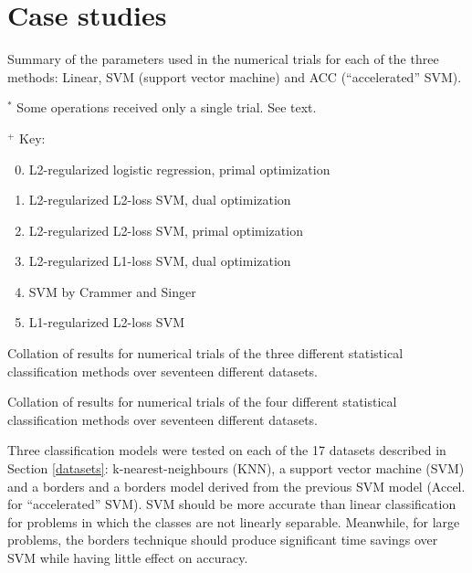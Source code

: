 \section{Case studies}

\label{results_section}

\begin{table}
	\caption{Summary of the parameters used in the numerical trials for each of the three methods: Linear, SVM (support vector machine) and ACC (``accelerated'' SVM).}
	\label{param}
	
	\vspace{1 ex}

	\raggedright 
	$^*$ Some operations received only a single trial. See text.

	$^+$ Key:\citep{Fan_etal2008}
	\begin{enumerate}
			\setcounter{enumi}{-1}
		\item L2-regularized logistic regression, primal optimization
		\item L2-regularized L2-loss SVM, dual optimization
		\item L2-regularized L2-loss SVM, primal optimization
		\item L2-regularized L1-loss SVM, dual optimization
		\item SVM by Crammer and Singer \citep{Crammer_Singer2002}
		\item L1-regularized L2-loss SVM
	\end{enumerate}
\end{table}

\begin{table}
	\caption{Collation of results for numerical trials of the three different statistical classification methods over seventeen different datasets.}
	\label{results}
	{\small
		
	}
\end{table}

\begin{table}
	\caption{Collation of results for numerical trials of the four different statistical classification methods over seventeen different datasets.}
	\label{results2}
	{\small
		
	}
\end{table}

Three classification models were tested on each of the 17 datasets described in
Section \ref{datasets}: k-nearest-neighbours (KNN), 
a support vector machine (SVM) and a borders and a borders
model derived from the previous SVM model (Accel. for ``accelerated'' SVM).
SVM should be more accurate than linear classification for problems in which
the classes are not linearly separable.
Meanwhile, for large problems, the borders technique should produce significant time savings over SVM while having little effect on accuracy.

